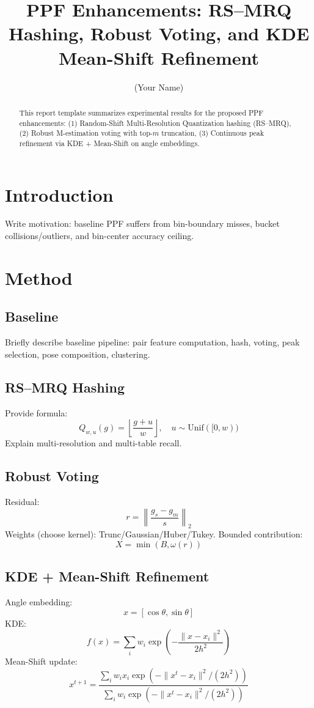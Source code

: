 \documentclass[10pt]{article}
\title{PPF Enhancements: RS--MRQ Hashing, Robust Voting, and KDE Mean-Shift Refinement}
\author{(Your Name)}
\date{}
\begin{document}
\maketitle

\begin{abstract}
This report template summarizes experimental results for the proposed PPF enhancements:
(1) Random-Shift Multi-Resolution Quantization hashing (RS--MRQ),
(2) Robust M-estimation voting with top-$m$ truncation,
(3) Continuous peak refinement via KDE + Mean-Shift on angle embeddings.
\end{abstract}

\section{Introduction}
Write motivation: baseline PPF suffers from bin-boundary misses, bucket collisions/outliers, and bin-center accuracy ceiling.

\section{Method}
\subsection{Baseline}
Briefly describe baseline pipeline: pair feature computation, hash, voting, peak selection, pose composition, clustering.

\subsection{RS--MRQ Hashing}
Provide formula:
\[
Q_{w,u}(g)=\left\lfloor\frac{g+u}{w}\right\rfloor,\quad u\sim\mathrm{Unif}([0,w))
\]
Explain multi-resolution and multi-table recall.

\subsection{Robust Voting}
Residual:
\[
r=\left\|\frac{g_s-g_m}{s}\right\|_2
\]
Weights (choose kernel):
Trunc/Gaussian/Huber/Tukey.
Bounded contribution:
\[
X=\min(B,\omega(r))
\]

\subsection{KDE + Mean-Shift Refinement}
Angle embedding:
\[
x=[\cos\theta,\sin\theta]
\]
KDE:
\[
f(x)=\sum_i w_i\exp\left(-\frac{\|x-x_i\|^2}{2h^2}\right)
\]
Mean-Shift update:
\[
x^{t+1}=\frac{\sum_i w_i x_i\exp(-\|x^t-x_i\|^2/(2h^2))}{\sum_i w_i\exp(-\|x^t-x_i\|^2/(2h^2))}
\]
\end{document}
